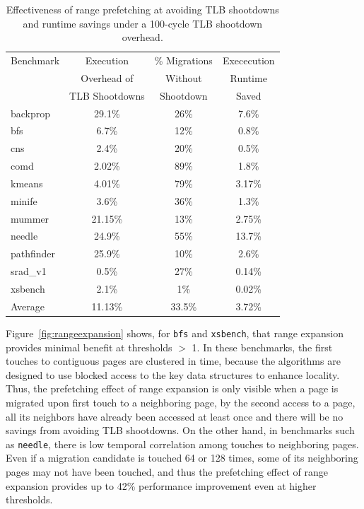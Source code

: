 \begin{table}[bh!]
\begin{center}
\begin{small}
\begin{tabular}{|l|c|c|c|}
\hline
Benchmark & Execution & \% Migrations & Exececution\\
          & Overhead of        &Without  & Runtime\\
          & TLB Shootdowns    & Shootdown & Saved\\
\hline
backprop & 29.1\%& 26\% & 7.6\%\\
bfs & 6.7\%&12\% & 0.8\%\\
cns & 2.4\%&20\% & 0.5\%\\
comd & 2.02\%&89\% & 1.8\%\\
kmeans & 4.01\%&79\% & 3.17\%\\
minife & 3.6\%&36\% & 1.3\%\\
mummer & 21.15\%&13\% & 2.75\%\\
needle & 24.9\%&55\% & 13.7\%\\
pathfinder & 25.9\%&10\% & 2.6\%\\
srad\_v1 & 0.5\%&27\% & 0.14\%\\
xsbench & 2.1\%&1\% & 0.02\%\\
\hline
Average & 11.13\%&33.5\% & 3.72\%\\
\hline
\end{tabular}
\caption{Effectiveness of range prefetching at avoiding TLB shootdowns and runtime savings under a 100-cycle TLB shootdown overhead.}
\label{tab:shootdowns}
\end{small}
\end{center}
\end{table}

Figure~\ref{fig:rangeexpansion} shows, for {\tt bfs} and {\tt xsbench}, that range expansion provides minimal
benefit at thresholds $>$ 1. In these benchmarks, the first touches to
contiguous pages are clustered in time, because the algorithms are designed to use blocked access to the key 
data structures to enhance locality. Thus, the prefetching effect of range
expansion is only visible when a page is migrated upon first touch to a
neighboring page, by the second access to a page, all its neighbors have already been accessed 
at least once and there will be no savings from avoiding TLB shootdowns. On the other hand, in benchmarks 
such as {\tt needle}, there is low temporal correlation among touches to neighboring pages.
Even if a migration candidate is touched 64 or 128 times, some of its
neighboring pages may not have been touched, and thus the prefetching
effect of range expansion provides up to 42\% performance improvement even at higher thresholds.

